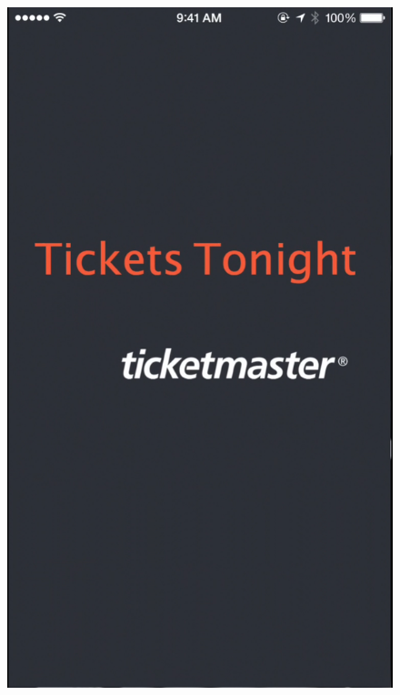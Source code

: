         \begin{figure}
        \centering
        \begin{minipage}{.5\textwidth}
        	\centering
        	\includegraphics[width=.7\linewidth]{./pics/app1.png}
        \end{minipage}%
        \begin{minipage}{.5\textwidth}
        	\centering

\end{minipage}
\end{figure}
